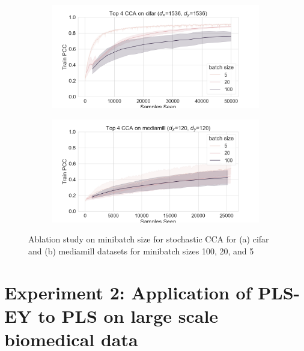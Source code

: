 \begin{figure}[h]
    \centering
    \begin{subfigure}[b]{0.49\textwidth}
        \centering
        \includegraphics[width=\textwidth]{figures/gradient_descent/CCA/cifar_minibatch_size_ablation.png}
        \caption{}
        \label{fig:cifar_minibatch_ablation}
    \end{subfigure}
    \begin{subfigure}[b]{0.49\textwidth}
        \centering
        \includegraphics[width=\textwidth]{figures/gradient_descent/CCA/mediamill_minibatch_size_ablation.png}
        \caption{}
        \label{fig:mediamill_minibatch_ablation}
    \end{subfigure}
    \caption{Ablation study on minibatch size for stochastic CCA for (a) cifar and (b) mediamill datasets for minibatch sizes 100, 20, and 5}
    \label{fig:minibatch size ablation}
\end{figure}



\section{Experiment 2: Application of PLS-EY to PLS on large scale biomedical data}


